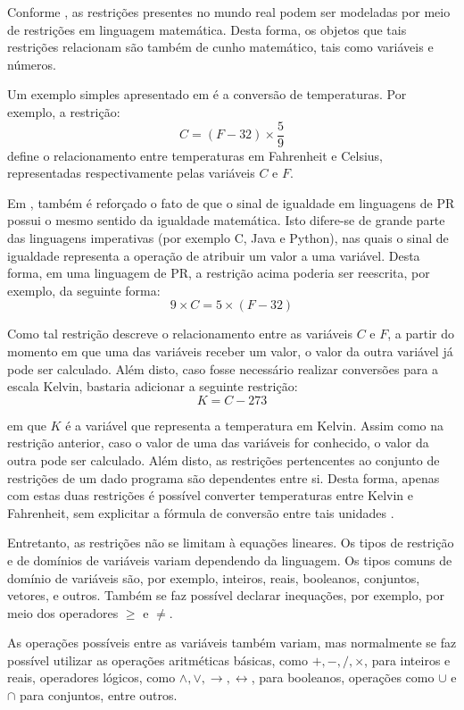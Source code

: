 Conforme \cite{stuckey}, as restrições presentes no mundo real podem ser modeladas por meio de restrições em linguagem matemática. Desta forma, os objetos que tais restrições relacionam são também de cunho matemático, tais como variáveis e números.

Um exemplo simples apresentado em \cite{leler} é a conversão de temperaturas. Por exemplo, a restrição:
\[
  C = (F - 32) \times \frac{5}{9}
\]
define o relacionamento entre temperaturas em Fahrenheit e Celsius, representadas respectivamente pelas variáveis $C$ e $F$.

Em \cite{leler}, também é reforçado o fato de que o sinal de igualdade em linguagens de PR possui o mesmo sentido da igualdade matemática. Isto difere-se de grande parte das linguagens imperativas (por exemplo C, Java e Python), nas quais o sinal de igualdade representa a operação de atribuir um valor a uma variável. Desta forma, em uma linguagem de PR, a restrição acima poderia ser reescrita, por exemplo, da seguinte forma:
\[
  9 \times C = 5 \times (F - 32)
\]

Como tal restrição descreve o relacionamento entre as variáveis $C$ e $F$, a partir do momento em que uma das variáveis receber um valor, o valor da outra variável já pode ser calculado. Além disto, caso fosse necessário realizar conversões para a escala Kelvin, bastaria adicionar a seguinte restrição:
\[
  K = C - 273
\]

em que $K$ é a variável que representa a temperatura em Kelvin. Assim como na restrição anterior, caso o valor de uma das variáveis for conhecido, o valor da outra pode ser calculado. Além disto, as restrições pertencentes ao conjunto de restrições de um dado programa são dependentes entre si. Desta forma, apenas com estas duas restrições é possível converter temperaturas entre Kelvin e Fahrenheit, sem explicitar a fórmula de conversão entre tais unidades \cite{leler}.

Entretanto, as restrições não se limitam à equações lineares. Os tipos de restrição e de domínios de variáveis variam dependendo da linguagem. Os tipos comuns de domínio de variáveis são, por exemplo, inteiros, reais, booleanos, conjuntos, vetores, e outros. Também se faz possível declarar inequações, por exemplo, por meio dos operadores $\ge$ e $\not=$.

As operações possíveis entre as variáveis também variam, mas normalmente se faz possível utilizar as operações aritméticas básicas, como $+, -, /, \times$, para inteiros e reais, operadores lógicos, como $\wedge, \vee, \rightarrow, \leftrightarrow$, para booleanos, operações como $\cup$ e $\cap$ para conjuntos, entre outros.

